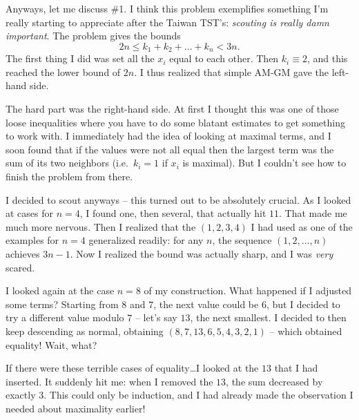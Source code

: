 \documentclass[11pt]{scrreprt}
\begin{document}
Anyways, let me discuss \#1. I think this problem exemplifies something I'm
really starting to appreciate after the Taiwan TST's: \emph{scouting is really damn important}.
The problem gives the bounds
\[ 2n \le k_1 + k_2 + \dots + k_n < 3n. \]
The first thing I did was set all the $x_i$ equal to each other.
Then $k_i \equiv 2$, and this reached the lower bound of $2n$.
I thus realized that simple AM-GM gave the left-hand side.

The hard part was the right-hand side.
At first I thought this was one of those loose inequalities where you have to do
some blatant estimates to get something to work with.
I immediately had the idea of looking at maximal terms,
and I soon found that if the values were not all equal then the largest term was
the sum of its two neighbors (i.e.\ $k_i = 1$ if $x_i$ is maximal).
But I couldn't see how to finish the problem from there.

I decided to scout anyways -- this turned out to be absolutely crucial.
As I looked at cases for $n=4$, I found one, then several, that actually hit $11$.
That made me much more nervous.
Then I realized that the $(1,2,3,4)$ I had used as one of the examples for $n=4$ generalized readily:
for any $n$, the sequence $(1,2,\dots,n)$ achieves $3n-1$.
Now I realized the bound was actually sharp, and I was \emph{very} scared.

I looked again at the case $n=8$ of my construction. What happened if I adjusted some terms?
Starting from $8$ and $7$, the next value could be $6$,
but I decided to try a different value modulo $7$ -- let's say $13$, the next smallest.
I decided to then keep descending as normal, obtaining $(8,7,13,6,5,4,3,2,1)$ -- which obtained equality!
Wait, what?

If there were these terrible cases of equality\dots I looked at the $13$ that I had inserted.
It suddenly hit me: when I removed the $13$, the sum decreased by exactly $3$.
This could only be induction, and I had already made the observation I needed about maximality earlier!
\end{document}
